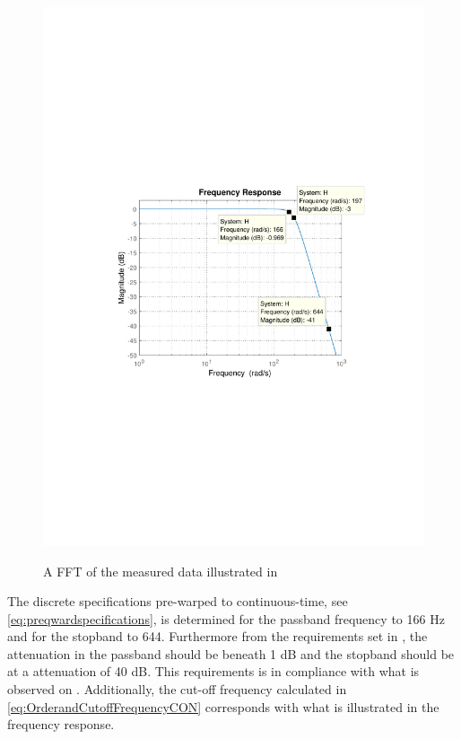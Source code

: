 \begin{figure}[H]
  \centering
  {
    \includegraphics[width=1.1\textwidth]{figures/ContinusFilterResponse.pdf}
  }
  \caption{A FFT of the measured data illustrated in }
  \label{fig:Continuoustimebodeplot}
\end{figure}
%
The discrete specifications pre-warped to continuous-time, see \eqref{eq:preqwardspecifications}, is determined for the passband frequency to 166 \si{Hz} and for the stopband to \si{644}. Furthermore from the requirements set in , the attenuation in the passband should be beneath 1 \si{dB} and the stopband should be at a attenuation of 40 \si{dB}. This requirements is in compliance with what is observed on . Additionally, the cut-off frequency calculated in \eqref{eq:OrderandCutoffFrequencyCON} corresponds with what is illustrated in the frequency response.

